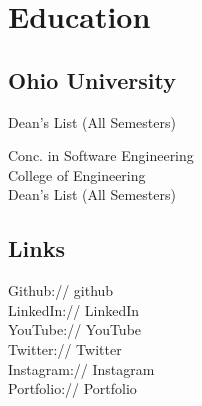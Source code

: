 \documentclass[letterpaper]{resume} %
\begin{document}



\begin{minipage}[t]{0.33\textwidth} %


\section{Education} 

\subsection{Ohio University}

Dean's List (All Semesters) \\

\sectionspace %

Conc. in Software Engineering \\
College of Engineering \\
Dean's List (All Semesters) \\


\sectionspace %
\sectionspace


\subsection{Links} 

Github:// github \\
LinkedIn:// LinkedIn \\
YouTube:// YouTube \\
Twitter:// Twitter \\
Instagram://  Instagram \\
Portfolio:// Portfolio


\end{minipage}
\end{document}
